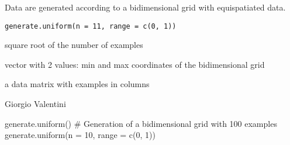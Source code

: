 \documentclass{article}
\begin{document}
\begin{Description}\relax
Data are generated according to a bidimensional grid with equispatiated data.
\end{Description}
\begin{Usage}
\begin{verbatim}
generate.uniform(n = 11, range = c(0, 1))
\end{verbatim}
\end{Usage}
\begin{Arguments}
\begin{ldescription}
\item[\code{n}] square root of the number of examples   
\item[\code{range}] vector with 2 values: min and max  coordinates of the bidimensional grid 
\end{ldescription}
\end{Arguments}
\begin{Value}
a data matrix with examples in columns
\end{Value}
\begin{Author}\relax
Giorgio Valentini 
\end{Author}
\begin{Examples}
\begin{ExampleCode}
generate.uniform()
# Generation of a bidimensional grid with 100 examples
generate.uniform(n = 10, range = c(0, 1))
\end{ExampleCode}
\end{Examples}
\end{document}
